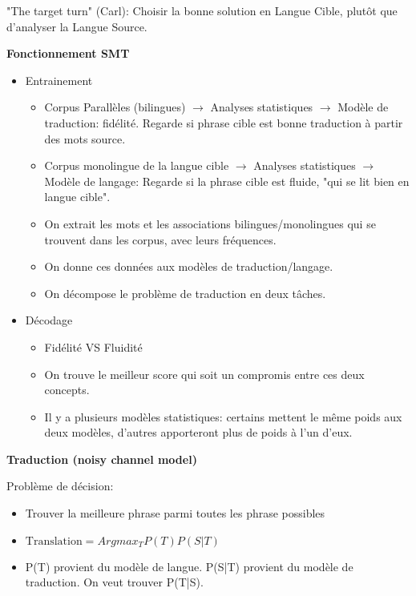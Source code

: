 "The target turn" (Carl): Choisir la bonne solution en Langue Cible, plutôt que d'analyser la Langue Source.\\

\newpage

\textbf{Fonctionnement SMT}

\begin{itemize}
    \item Entrainement
        \begin{itemize}
            \item Corpus Parallèles (bilingues) $\rightarrow$ Analyses statistiques $\rightarrow$ Modèle de traduction: fidélité. Regarde si phrase cible est bonne traduction à partir des mots source.
            \item Corpus monolingue de la langue cible $\rightarrow$ Analyses statistiques $\rightarrow$ Modèle de langage: Regarde si la phrase cible est fluide, "qui se lit bien en langue cible".
            \item On extrait les mots et les associations bilingues/monolingues qui se trouvent dans les corpus, avec leurs fréquences.
            \item On donne ces données aux modèles de traduction/langage.
            \item On décompose le problème de traduction en deux tâches.
        \end{itemize}
    \item Décodage
        \begin{itemize}
            \item Fidélité VS Fluidité
            \item On trouve le meilleur score qui soit un compromis entre ces deux concepts.
            \item Il y a plusieurs modèles statistiques: certains mettent le même poids aux deux modèles, d'autres apporteront plus de poids à l'un d'eux.\\
        \end{itemize}
\end{itemize}

\textbf{Traduction (noisy channel model)}

Problème de décision:

\begin{itemize}
    \item Trouver la meilleure phrase parmi toutes les phrase possibles
    \item $\text{Translation} = Argmax_T P(T) P(S|T)$
    \item P(T) provient du modèle de langue. P(S|T) provient du modèle de traduction. On veut trouver P(T|S). \\
\end{itemize}


